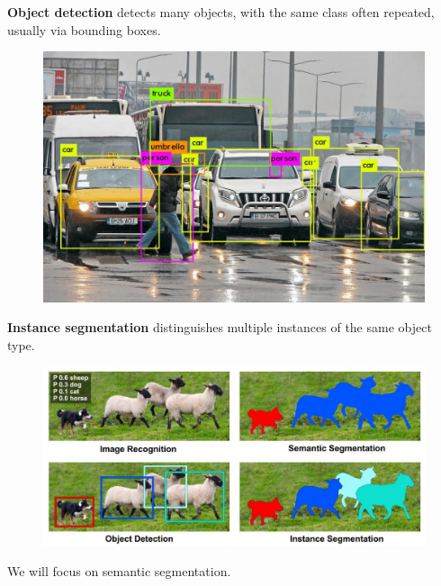 \documentclass{report}
\begin{document}
\begin{definition}
    \textbf{Object detection} detects many objects, with the same class often repeated, usually via bounding boxes.

    \begin{figure}[H]
        \centering
        \includegraphics[width=1.0\textwidth]{.././assets/8.22.png}
    \end{figure}
\end{definition}

\begin{definition}
    \textbf{Instance segmentation} distinguishes multiple instances of the same object type.

    \begin{figure}[H]
        \centering
        \includegraphics[width=1.0\textwidth]{.././assets/8.23.png}
    \end{figure}
\end{definition}

We will focus on semantic segmentation.
\end{document}
